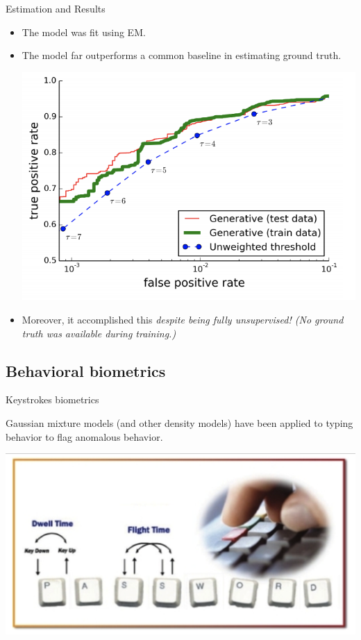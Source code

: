 \documentclass[10pt]{beamer}
\begin{document}
\begin{frame}{Estimation and Results}

\begin{itemize}
\item The model was fit using EM.
\item The model far outperforms a common baseline in estimating ground truth.
\begin{center}
\includegraphics[width=.6\textwidth]{images/kantchelian_performance}
\end{center}
\item Moreover, it accomplished this \it{despite being fully unsupervised}!  (No ground truth was available during training.)
\end{itemize}

\end{frame}

\subsection{Behavioral biometrics}
\begin{frame}{Keystrokes biometrics}

Gaussian mixture models (and other density models) have been applied to typing behavior to flag anomalous behavior.

\begin{center}
\includegraphics[width=\textwidth]{images/keystroke_dynamics}
\end{center}

\end{frame}
\end{document}
